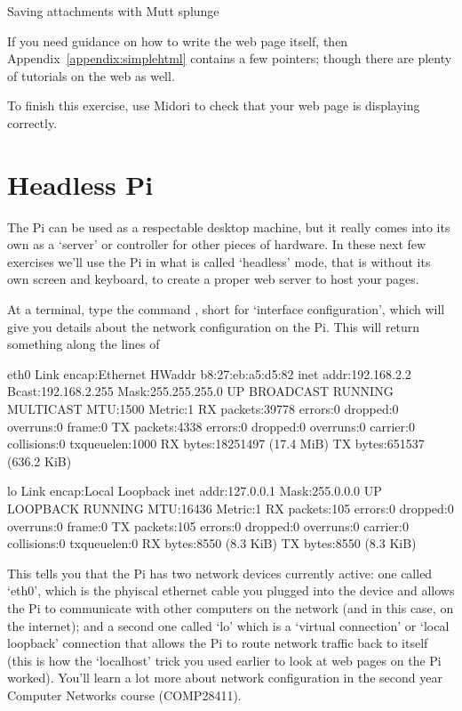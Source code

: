 \begin{diversion}{Saving attachments with Mutt}
\label{breakout:attachments}
splunge
\end{diversion}

If you need guidance on how to write the web page itself, then Appendix~\ref{appendix:simplehtml} contains a few pointers; though there are plenty of tutorials on the web as well. 

To finish this exercise, use Midori to check that your web page is displaying correctly.

\section{Headless Pi}
\label{section:headless}

The Pi can be used as a respectable desktop machine, but it really comes into its own as a `server' or controller for other pieces of hardware. In these next few exercises we'll use the Pi in what is called `headless' mode, that is without its own screen and keyboard, to create a proper web server to host your pages. 

At a terminal, type the command , short for `interface configuration', which will give you details about the network configuration on the Pi. This will return something along the lines of

\begin{ttoutenv}
eth0      Link encap:Ethernet  HWaddr b8:27:eb:a5:d5:82
          inet addr:192.168.2.2  Bcast:192.168.2.255  Mask:255.255.255.0
          UP BROADCAST RUNNING MULTICAST  MTU:1500  Metric:1
          RX packets:39778 errors:0 dropped:0 overruns:0 frame:0
          TX packets:4338 errors:0 dropped:0 overruns:0 carrier:0
          collisions:0 txqueuelen:1000
          RX bytes:18251497 (17.4 MiB)  TX bytes:651537 (636.2 KiB)

lo        Link encap:Local Loopback
          inet addr:127.0.0.1  Mask:255.0.0.0
          UP LOOPBACK RUNNING  MTU:16436  Metric:1
          RX packets:105 errors:0 dropped:0 overruns:0 frame:0
          TX packets:105 errors:0 dropped:0 overruns:0 carrier:0
          collisions:0 txqueuelen:0
          RX bytes:8550 (8.3 KiB)  TX bytes:8550 (8.3 KiB)
\end{ttoutenv}

This tells you that the Pi has two network devices currently active: one called `eth0', which is the phyiscal ethernet cable you plugged into the device and allows the Pi to communicate with other computers on the network (and in this case, on the internet); and a second one called `lo' which is a `virtual connection' or `local loopback' connection that allows the Pi to route network traffic back to itself (this is how the `localhost' trick you used earlier to look at web pages on the Pi worked). You'll learn a lot more about network configuration in the second year Computer Networks course (COMP28411). 

